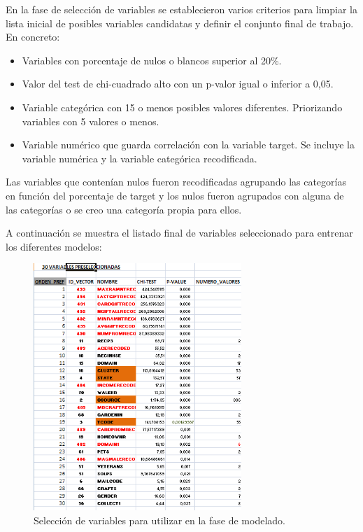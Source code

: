 En la fase de selección de variables se establecieron varios criterios para limpiar la lista inicial de posibles variables candidatas y definir el conjunto final de trabajo. En concreto:

\begin{itemize}

\item{Variables con porcentaje de nulos o blancos superior al 20\%.}
\item{Valor del test de chi-cuadrado alto con un p-valor igual o inferior a 0,05.}
\item{Variable categórica con 15 o menos posibles valores diferentes. Priorizando variables con 5 valores o menos.}
\item{Variable numérico que guarda correlación con la variable target. Se incluye la variable numérica y la variable categórica recodificada.}

\end{itemize}

Las variables que contenían nulos fueron recodificadas agrupando las categorías en función del porcentaje de target y los nulos fueron agrupados con alguna de las categorías o se creo una categoría propia para ellos.

A continuación se muestra el listado final de variables seleccionado para entrenar los diferentes modelos:

\begin{figure}[H]
\begin{center}
\includegraphics[width=0.7\textwidth]{img/seleccion}
\caption{Selección de variables para utilizar en la fase de modelado.}
\end{center}
\end{figure}


